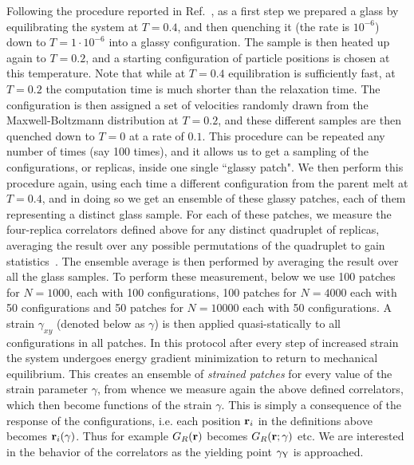 \documentclass[9pt,twocolumn,twoside]{pnas-new}
\begin{document}
Following the procedure reported in Ref.~\cite{16JPRS}, as a first step we prepared a glass by equilibrating the system at $T=0.4$, and then quenching it (the rate is $10^{-6}$) down to $T=1\cdot10^{-6}$ into a glassy configuration. The sample is then heated up again to $T=0.2$, and a starting configuration of particle positions is chosen at this temperature. Note that while at $T=0.4$ equilibration is sufficiently fast, at $T=0.2$ the computation time is much shorter than the relaxation time. The configuration is then assigned a set of velocities randomly drawn from the Maxwell-Boltzmann distribution at $T=0.2$, and these different samples are then quenched down to $T=0$ at a rate of $0.1$. This procedure can be repeated any number of times (say 100 times), and it allows us to get a sampling of the configurations, or replicas, inside one single ``glassy patch". We then perform this procedure again, using each time a different configuration from the parent melt at $T=0.4$, and in doing so we get an ensemble of these glassy patches, each of them representing a distinct glass sample. For each of these patches, we measure the four-replica correlators defined above for any distinct quadruplet of replicas, averaging the result over any possible permutations of the quadruplet to gain statistics~\cite{14BB2}. The ensemble average is then performed by averaging the result over all the glass samples. To perform these measurement, below we use 100 patches for $N=1000$, each with 100 configurations, 100 patches for $N=4000$  each with 50 configurations and 50 patches for
$N=10000$ each with 50 configurations.
A strain $\gamma_{xy}$ (denoted below as $\gamma$) is then applied quasi-statically to all configurations in all patches. In this protocol after every
step of increased strain the system undergoes energy gradient minimization to return to mechanical equilibrium. This creates an ensemble of \emph{strained patches} for every value of the strain parameter $\gamma$, from whence we measure again the above defined correlators, which then become functions of the strain $\gamma$. This is simply a consequence of the response of the configurations, i.e. each position ${\bf r}_i$ in the definitions above becomes ${\bf r}_i(\gamma)$. Thus for example $G_R({\bf r})$ becomes $G_R({\bf r}; \gamma)$ etc. We are interested in the behavior of the correlators as the yielding point $\gamma_{\rm Y}$ is approached.
\end{document}

